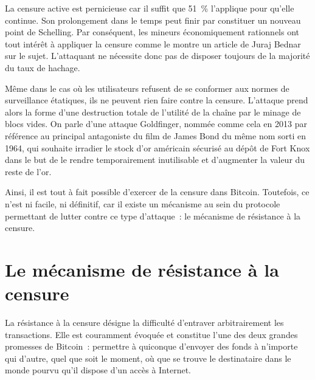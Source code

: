 La censure active est pernicieuse car il suffit que 51~\% l'applique pour qu'elle continue. Son prolongement dans le temps peut finir par constituer un nouveau point de Schelling. Par conséquent, les mineurs économiquement rationnels ont tout intérêt à appliquer la censure comme le montre un article de Juraj Bednar sur le sujet. L'attaquant ne nécessite donc pas de disposer toujours de la majorité du taux de hachage.

Même dans le cas où les utilisateurs refusent de se conformer aux normes de surveillance étatiques, ils ne peuvent rien faire contre la censure. L'attaque prend alors la forme d'une destruction totale de l'utilité de la chaîne par le minage de blocs vides. On parle d'une attaque Goldfinger, nommée comme cela en 2013 par référence au principal antagoniste du film de James Bond du même nom sorti en 1964, qui souhaite irradier le stock d'or américain sécurisé au dépôt de Fort Knox dans le but de le rendre temporairement inutilisable et d'augmenter la valeur du reste de l'or.

Ainsi, il est tout à fait possible d'exercer de la censure dans Bitcoin. Toutefois, ce n'est ni facile, ni définitif, car il existe un mécanisme au sein du protocole  permettant de lutter contre ce type d'attaque~: le mécanisme de résistance à la censure.

\section*{Le mécanisme de résistance à la censure}

La résistance à la censure désigne la difficulté d'entraver arbitrairement les transactions. Elle est couramment évoquée et constitue l'une des deux grandes promesses de Bitcoin~: permettre à quiconque d'envoyer des fonds à n'importe qui d'autre, quel que soit le moment, où que se trouve le destinataire dans le monde pourvu qu'il dispose d'un accès à Internet.

